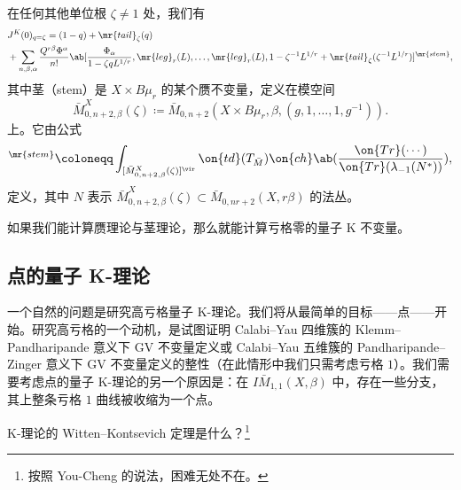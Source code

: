 \begin{prop}
    在任何其他单位根 \(\zeta \neq 1\) 处，我们有
    \begin{align*}
        &J^K(0)_{q = \zeta} = (1-q) + \mr{tail}_{\zeta}(q) \\
        &+ \sum_{n,\beta,\alpha} \frac{Q^{r\beta}\Phi^{\alpha}}{n!} \ab[\frac{\Phi_{\alpha}}{1-\zeta q L^{1/r}}, \mr{leg}_r(L), \ldots, \mr{leg}_r(L), 1 - \zeta^{-1}L^{1/r} + \mr{tail}_{\zeta}(\zeta^{-1} L^{1/r})]^{\mr{stem}},
    \end{align*}
    其中茎（stem）是 \(X \times B\mu_r\) 的某个赝不变量，定义在模空间
    \[ \bar{M}_{0,n+2,\beta}^X(\zeta) \coloneqq \bar{M}_{0,n+2}(X \times B\mu_r, \beta, (g, 1, \ldots, 1, g^{-1})). \]
    上。它由公式
    \begin{align*}
        [\cdots]^{\mr{stem}} \coloneqq \int_{[\bar{M}_{0,n+2,\beta}^X(\zeta)]^{\vir}} \on{td}(T_{\bar{M}}) \on{ch}\ab(\frac{\on{Tr}(\cdots)}{\on{Tr}(\lambda_{-1}(N^*))}), 
    \end{align*}
    定义，其中 \(N\) 表示 \(\bar{M}_{0,n+2,\beta}^X(\zeta) \subset \bar{M}_{0,nr+2}(X, r\beta)\) 的法丛。
\end{prop}

\begin{rmk}
    如果我们能计算赝理论与茎理论，那么就能计算亏格零的量子 K 不变量。
\end{rmk}

\subsection{点的量子 K-理论}%
\label{sub:Quantum K-theory of a point}

一个自然的问题是研究高亏格量子 K-理论。我们将从最简单的目标——点——开始。研究高亏格的一个动机，是试图证明 Calabi–Yau 四维簇的 Klemm–Pandharipande 意义下 GV 不变量定义或 Calabi–Yau 五维簇的 Pandharipande–Zinger 意义下 GV 不变量定义的整性（在此情形中我们只需考虑亏格 \(1\)）。我们需要考虑点的量子 K-理论的另一个原因是：在 \(I\bar{M}_{1,1}(X, \beta)\) 中，存在一些分支，其上整条亏格 \(1\) 曲线被收缩为一个点。

\begin{quest}
    K-理论的 Witten–Kontsevich 定理是什么？\footnote{按照 You-Cheng 的说法，困难无处不在。}
\end{quest}


